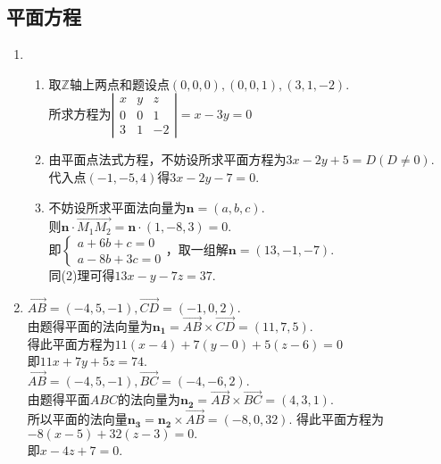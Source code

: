 \documentclass[UTF8]{ctexart}
\begin{document}
\subsection{平面方程}
\begin{enumerate}
\item \begin{enumerate}[(1)]
\item 取$\mathbb{Z}$轴上两点和题设点$\left(0,0,0\right),\left(0,0,1\right),\left(3,1,-2\right).$\\
所求方程为$\left|\begin{array}{ccc}x&y&z\\0&0&1\\3&1&-2\end{array}\right|=x-3y=0$
\item 由平面点法式方程，不妨设所求平面方程为$3x-2y+5=D\left(D\neq0\right).$\\
代入点$\left(-1,-5,4\right)$得$3x-2y-7=0.$
\item 不妨设所求平面法向量为$\mathbf{n}=\left(a,b,c\right).$\\
则$\mathbf{n}\cdot\overrightarrow{M_1M_2}=\mathbf{n}\cdot\left(1,-8,3\right)=0.$\\
即$\left\{\begin{array}{c}a+6b+c=0\\a-8b+3c=0\end{array}\right.$，取一组解$\mathbf{n}=\left(13,-1,-7\right).$\\
同(2)理可得$13x-y-7z=37.$\end{enumerate}

\item $\overrightarrow{AB}=\left(-4,5,-1\right),\overrightarrow{CD}=\left(-1,0,2\right).$\\
由题得平面的法向量为$\mathbf{n_1}=\overrightarrow{AB}\times\overrightarrow{CD}=\left(11,7,5\right).$\\
得此平面方程为$11\left(x-4\right)+7\left(y-0\right)+5\left(z-6\right)=0$\\
即$11x+7y+5z=74.$\\
$\overrightarrow{AB}=\left(-4,5,-1\right),\overrightarrow{BC}=\left(-4,-6,2\right).$\\
由题得平面$ABC$的法向量为$\mathbf{n_2}=\overrightarrow{AB}\times\overrightarrow{BC}=\left(4,3,1\right).$\\
所以平面的法向量$\mathbf{n_3}=\mathbf{n_2}\times\overrightarrow{AB}=\left(-8,0,32\right).$
得此平面方程为$-8\left(x-5\right)+32\left(z-3\right)=0.$\\
即$x-4z+7=0.$


\end{enumerate}
\end{document}
